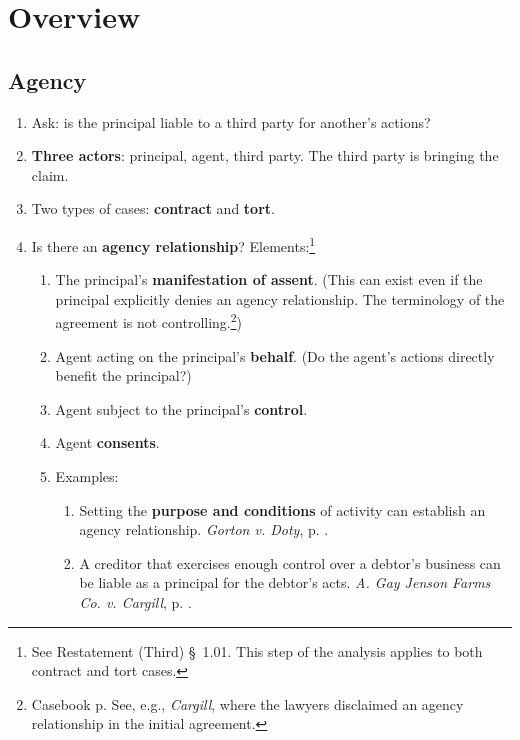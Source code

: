 \section{Overview}

\subsection{Agency}

\begin{enumerate}
    \item Ask: is the principal liable to a third party for another's actions?
    \item \textbf{Three actors}: principal, agent, third party. The third 
    party is bringing the claim.
    \item Two types of cases: \textbf{contract} and \textbf{tort}.
    \item Is there an \textbf{agency relationship}? Elements:\footnote{See 
    Restatement (Third) \S\ 1.01. This step of the analysis applies to both 
    contract and tort cases.}
    \begin{enumerate}
        \item The principal's \textbf{manifestation of assent}. (This can 
        exist even if the principal explicitly denies an agency relationship. 
        The terminology of the agreement is not controlling.\footnote{Casebook 
        p. See, e.g., \emph{Cargill}, where the lawyers disclaimed an agency 
        relationship in the initial agreement.})
        \item Agent acting on the principal's \textbf{behalf}. (Do the agent's 
        actions directly benefit the principal?)
        \item Agent subject to the principal's \textbf{control}.
        \item Agent \textbf{consents}.
        \item Examples:
        \begin{enumerate}
            \item Setting the \textbf{purpose and conditions} of activity can 
            establish an agency relationship. \emph{Gorton v. Doty}, p.  
            \pageref{subsub:gorton}.
            \item A creditor that exercises enough control over a debtor's 
            business can be liable as a principal for the debtor's acts. 
            \emph{A. Gay Jenson Farms Co. v. Cargill}, p. 
            \pageref{subsub:cargill}.
        \end{enumerate}

\end{enumerate}
\end{enumerate}
